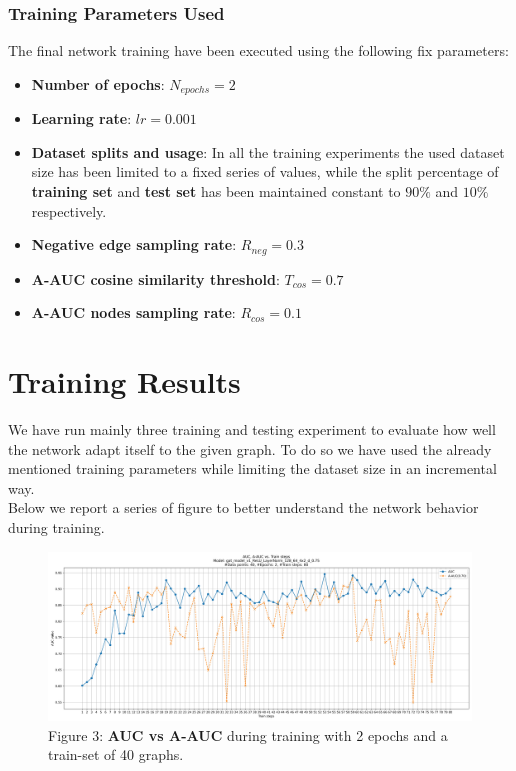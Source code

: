 \documentclass[11pt]{article}
\begin{document}
	\subsubsection{Training Parameters Used}
	The final network training have been executed using the following fix parameters:
	\begin{itemize}
		\item{\textbf{Number of epochs}}: $N_{epochs}=2$
		
		\item{\textbf{Learning rate}}: $lr=0.001$
		
		\item{\textbf{Dataset splits and usage}}: In all the training experiments the used dataset size has been limited to a fixed series of values, while the split percentage of \textbf{training set} and \textbf{test set} has been maintained constant to $90\%$ and $10\%$ respectively.    
				
		\item{\textbf{Negative edge sampling rate}}: $R_{neg}=0.3$
		
		\item{\textbf{A-AUC cosine similarity threshold}}: $T_{cos}=0.7$
		
		\item{\textbf{A-AUC nodes sampling rate}}: $R_{cos}=0.1$
	\end{itemize}
	
	\section{Training Results}
	We have run mainly three training and testing experiment to evaluate how well the network adapt itself to the given graph. To do so we have used the already mentioned training parameters while limiting the dataset size in an incremental way. \\
	Below we report a series of figure to better understand the network behavior during training.
	
	\begin{figure}[h!] %
		\centering
		\label{figure_3}
		\includegraphics[width=1\textwidth]{images/train_auc_gat_model_v1_ReLU_LayerNorm_128_64_4x2_d_0.75_40_2_20250202-144005.jpg}
		\caption{Figure 3: \textbf{AUC vs A-AUC} during training with 2 epochs and a train-set of 40 graphs.}
	\end{figure}
	
\end{document}
